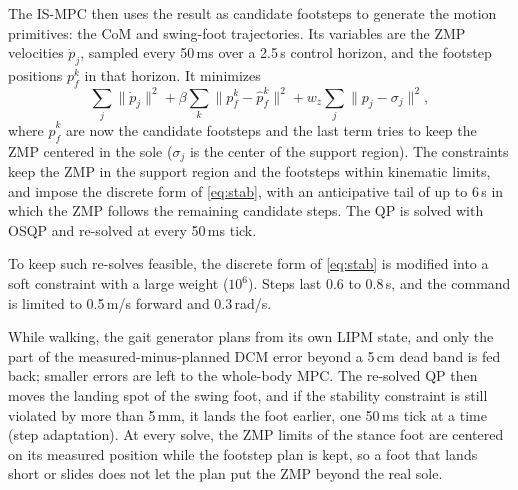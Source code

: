 \documentclass[conference]{IEEEtran}
\begin{document}
The IS-MPC then uses the result as candidate footsteps to generate the motion primitives: the CoM and swing-foot trajectories.
Its variables are the ZMP velocities $\dot p_j$, sampled every 50\,ms over a 2.5\,s control horizon, and the footstep positions $p_f^k$ in that horizon. It minimizes
\begin{equation}
\textstyle\sum_j\|\dot p_j\|^2+\beta\sum_k\|p_f^k-\hat p_f^k\|^2+w_z\sum_j\|p_j-\sigma_j\|^2,
\label{eq:ismpc}
\end{equation}
where $\hat p_f^k$ are now the candidate footsteps and the last term tries to keep the ZMP centered in the sole ($\sigma_j$ is the center of the support region).
The constraints keep the ZMP in the support region and the footsteps within kinematic limits, and impose the discrete form of \eqref{eq:stab}, with an anticipative tail \cite{scianca2020ismpc} of up to 6\,s in which the ZMP follows the remaining candidate steps.
The QP is solved with OSQP \cite{stellato2020osqp} and re-solved at every 50\,ms tick.

To keep such re-solves feasible, the discrete form of \eqref{eq:stab} is modified into a soft constraint with a large weight ($10^6$).
Steps last 0.6 to 0.8\,s, and the command is limited to 0.5\,m/s forward and 0.3\,rad/s.

While walking, the gait generator plans from its own LIPM state, and only the part of the measured-minus-planned DCM error beyond a 5\,cm dead band is fed back; smaller errors are left to the whole-body MPC.
The re-solved QP then moves the landing spot of the swing foot, and if the stability constraint is still violated by more than 5\,mm, it lands the foot earlier, one 50\,ms tick at a time (step adaptation).
At every solve, the ZMP limits of the stance foot are centered on its measured position while the footstep plan is kept, so a foot that lands short or slides does not let the plan put the ZMP beyond the real sole.
\end{document}
